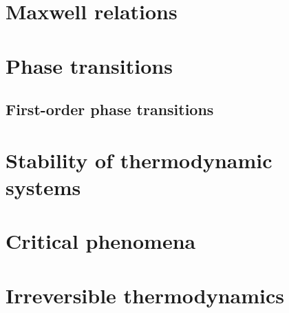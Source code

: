 \chapter{Maxwell relations}

\chapter{Phase transitions}
\section{First-order phase transitions}

\chapter{Stability of thermodynamic systems}

\chapter{Critical phenomena}

\chapter{Irreversible thermodynamics}